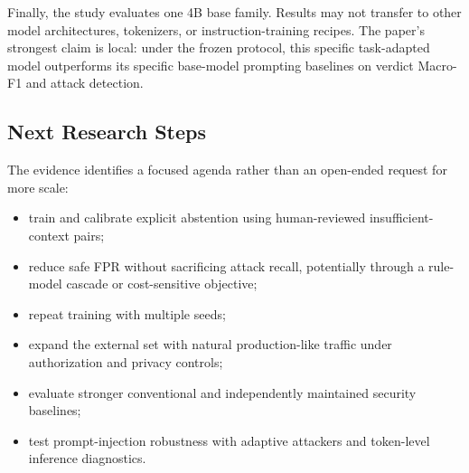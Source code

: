Finally, the study evaluates one 4B base family. Results may not transfer to other model architectures, tokenizers, or instruction-training recipes. The paper's strongest claim is local: under the frozen protocol, this specific task-adapted model outperforms its specific base-model prompting baselines on verdict Macro-F1 and attack detection.

\subsection{Next Research Steps}
The evidence identifies a focused agenda rather than an open-ended request for more scale:
\begin{itemize}
    \item train and calibrate explicit abstention using human-reviewed insufficient-context pairs;
    \item reduce safe FPR without sacrificing attack recall, potentially through a rule-model cascade or cost-sensitive objective;
    \item repeat training with multiple seeds;
    \item expand the external set with natural production-like traffic under authorization and privacy controls;
    \item evaluate stronger conventional and independently maintained security baselines;
    \item test prompt-injection robustness with adaptive attackers and token-level inference diagnostics.
\end{itemize}
